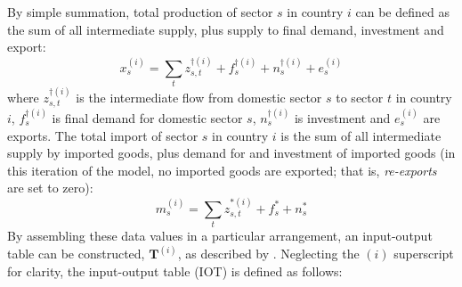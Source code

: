 \documentclass[a4paper]{article}
\begin{document}
By simple summation, total production of sector $s$ in country $i$ can be defined as the sum of all intermediate supply, plus supply to final demand, investment and export:
\begin{equation}\label{eqn:x}
x_s^{(i)}=\sum\limits_{t}z_{s,t}^{\dagger(i)} + f_s^{\dagger(i)} + n_s^{\dagger(i)} + e_s^{(i)}
\end{equation}
where $z_{s,t}^{\dagger(i)}$ is the intermediate flow from domestic sector $s$ to sector $t$ in country $i$, $f_s^{\dagger(i)}$ is final demand for domestic sector $s$, $n_s^{\dagger(i)}$ is investment and $e_s^{(i)}$ are exports.
The total import of sector $s$ in country $i$ is the sum of all intermediate supply by imported goods, plus demand for and investment of imported goods (in this iteration of the model, no imported goods are exported; that is, \textit{re-exports} are set to zero):
\begin{equation}\label{eqn:m}
m_s^{(i)}=\sum\limits_{t}z_{s,t}^{*(i)} + f_s^* + n_s^*
\end{equation}
By assembling these data values in a particular arrangement, an input-output table can be constructed, $\boldsymbol{T}^{(i)}$, as described by \textcite{Miller1985}.
Neglecting the $(i)$ superscript for clarity, the input-output table (IOT) is defined as follows:
\end{document}

